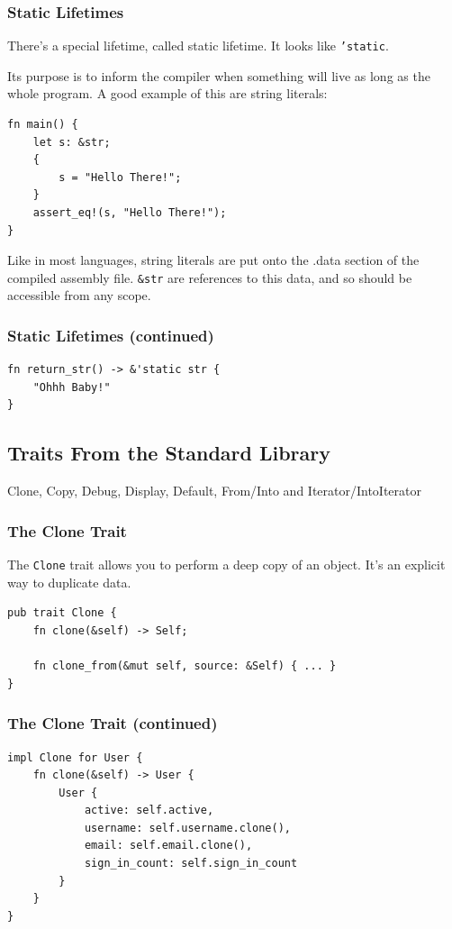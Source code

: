 \documentclass{slides}
\begin{document}
\begin{frame}[fragile]
\frametitle{Static Lifetimes}
There's a special lifetime, called static lifetime. It looks like \texttt{'static}.

Its purpose is to inform the compiler when something will live as long as the whole program. A good example of this are string literals:
\begin{verbatim}
fn main() {
    let s: &str;
    {
        s = "Hello There!";
    }
    assert_eq!(s, "Hello There!");
}
\end{verbatim}
Like in most languages, string literals are put onto the .data section of the compiled assembly file. \texttt{&str} are references to this data, and so should be accessible from any scope.
\end{frame}

\begin{frame}[fragile]
\frametitle{Static Lifetimes (continued)}
\begin{verbatim}
fn return_str() -> &'static str {
    "Ohhh Baby!"
}
\end{verbatim}
\end{frame}


\begin{frame}[fragile]
\section{Traits From the Standard Library}
\begin{center}
    Clone, Copy, Debug, Display, Default, From/Into and Iterator/IntoIterator
\end{center}
\end{frame}

\begin{frame}[fragile]
\frametitle{The Clone Trait}
The \texttt{Clone} trait allows you to perform a deep copy of an object. It's an explicit way to duplicate data.
\begin{verbatim}
pub trait Clone {
    fn clone(&self) -> Self;

    fn clone_from(&mut self, source: &Self) { ... }
}
\end{verbatim}
\end{frame}

\begin{frame}[fragile]
\frametitle{The Clone Trait (continued)}
\begin{verbatim}
impl Clone for User {
    fn clone(&self) -> User {
        User {
            active: self.active,
            username: self.username.clone(),
            email: self.email.clone(),
            sign_in_count: self.sign_in_count
        }
    }
}
\end{verbatim}
\end{frame}
\end{document}
